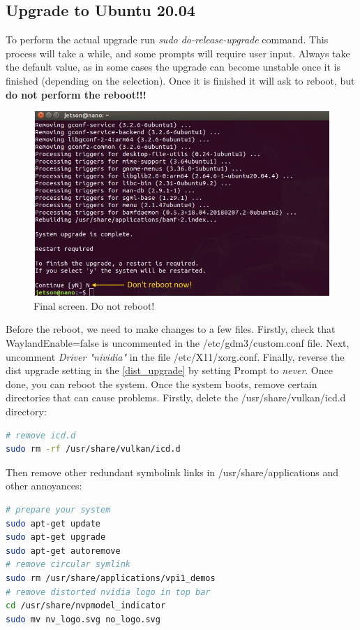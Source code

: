 \subsection{Upgrade to Ubuntu 20.04}
To perform the actual upgrade run \textit{sudo do-release-upgrade} command. This process will take a while, and some prompts will require user input.
Always take the default value, as in some cases the upgrade can become unstable once it is finished (depending on the selection). Once it is finished
it will ask to reboot, but \textbf{do not perform the reboot!!!}
\begin{figure}[h]
    \centering
    \includegraphics[width=\textwidth]{figures/os_upgrades/do_not_reboot.PNG}
    \caption{Final screen. Do not reboot!}
\end{figure}
Before the reboot, we need to make changes to a few files. Firstly, check that WaylandEnable=false is uncommented in the /etc/gdm3/custom.conf file. Next, uncomment \textit{Driver "nividia"} in the file /etc/X11/xorg.conf. Finally, reverse the dist upgrade setting in the \ref{dist_upgrade} by setting Prompt to \textit{never}. Once done, you can reboot the system.
Once the system boots, remove certain directories that can cause problems. Firstly, delete the /usr/share/vulkan/icd.d directory:
\begin{lstlisting}[language=bash, belowskip=-0.8 \baselineskip]
# remove icd.d
sudo rm -rf /usr/share/vulkan/icd.d
\end{lstlisting}
Then remove other redundant symbolink links in /usr/share/applications and other annoyances:
\begin{lstlisting}[language=bash, belowskip=-0.8 \baselineskip]
# prepare your system
sudo apt-get update
sudo apt-get upgrade
sudo apt-get autoremove
# remove circular symlink
sudo rm /usr/share/applications/vpi1_demos
# remove distorted nvidia logo in top bar
cd /usr/share/nvpmodel_indicator
sudo mv nv_logo.svg no_logo.svg
\end{lstlisting}
